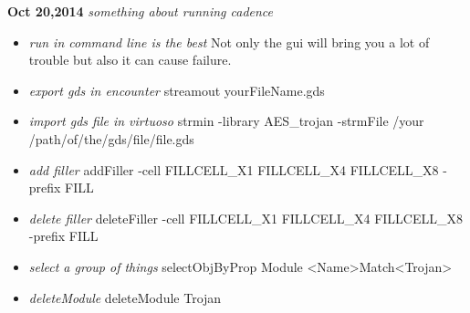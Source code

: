 \documentclass[]{article}
\begin{document}
\noindent \textbf{Oct 20,2014}
\textit{something about running cadence}
\indent		\begin{itemize}
                \item \textit{run in command line is the best} Not only the gui will bring you a lot
                        of trouble but also it can cause failure.
                \item \textit{export gds in encounter} streamout yourFileName.gds
                \item \textit{import gds file in virtuoso} strmin -library AES\_trojan -strmFile /your
                        /path/of/the/gds/file/file.gds
                \item \textit{add filler} addFiller -cell FILLCELL\_X1 FILLCELL\_X4 FILLCELL\_X8 -prefix FILL
                \item \textit{delete filler} deleteFiller -cell FILLCELL\_X1 FILLCELL\_X4 FILLCELL\_X8 -prefix FILL
                \item \textit{select a group of things} selectObjByProp Module <Name>Match<Trojan>
                \item \textit{deleteModule} deleteModule Trojan
            \end{itemize}
\end{document}
